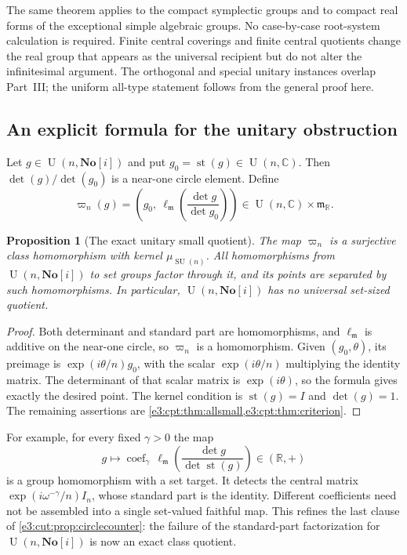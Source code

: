 \documentclass[11pt,letterpaper]{article}
\numberwithin{equation}{section}
\newtheorem{proposition}[proposition]{Proposition}
\theoremstyle{definition}
\theoremstyle{remark}
\newcommand{\No}{\mathbf{No}}
\newcommand{\R}{\mathbb R}
\newcommand{\C}{\mathbb C}
\newcommand{\mm}{\mathfrak m}
\newcommand{\st}{\operatorname{st}}
\newcommand{\SU}{\operatorname{SU}}
\newcommand{\Un}{\operatorname{U}}
\newcommand{\coef}{\operatorname{coef}}
\begin{document}
The same theorem applies to the compact symplectic groups and to compact real
forms of the exceptional simple algebraic groups. No case-by-case root-system
calculation is required. Finite central coverings and finite central quotients
change the real group that appears as the universal recipient but do not alter
the infinitesimal argument. The orthogonal and special unitary instances overlap
Part~III; the uniform all-type statement follows from the general proof here.

\subsection{An explicit formula for the unitary obstruction}

Let $g\in\Un(n,\No[i])$ and put $g_0=\st(g)\in\Un(n,\C)$. Then
$\det(g)/\det(g_0)$ is a near-one circle element. Define
\begin{equation}\label{e3:cpt:eq:unitaryq}
 \varpi_n(g)=\left(g_0,\ \ell_{\mm}\!\left(\frac{\det g}{\det g_0}\right)\right)
 \in\Un(n,\C)\times\mm_{\R}.
\end{equation}

\begin{proposition}[The exact unitary small quotient]\label{e3:cpt:prop:unitary}
The map $\varpi_n$ is a surjective class homomorphism with kernel
$\mu_{\SU(n)}$. All homomorphisms from $\Un(n,\No[i])$ to set groups factor
through it, and its points are separated by such homomorphisms. In particular,
$\Un(n,\No[i])$ has no universal set-sized quotient.
\end{proposition}
\begin{proof}
Both determinant and standard part are homomorphisms, and $\ell_{\mm}$ is
additive on the near-one circle, so $\varpi_n$ is a homomorphism. Given
$(g_0,\theta)$, its preimage is $\exp(i\theta/n)g_0$, with the scalar
$\exp(i\theta/n)$ multiplying the identity matrix. The determinant of that scalar
matrix is $\exp(i\theta)$, so the formula gives exactly the desired point. The
kernel condition is $\st(g)=I$ and $\det(g)=1$. The remaining assertions are
\cref{e3:cpt:thm:allsmall,e3:cpt:thm:criterion}.
\end{proof}

For example, for every fixed $\gamma>0$ the map
\[
 g\longmapsto\coef_\gamma\,\ell_{\mm}\!\left(\frac{\det g}{\det\st(g)}\right)
 \in(\R,+)
\]
is a group homomorphism with a set target. It detects the central matrix
$\exp(i\omega^{-\gamma}/n)I_n$, whose standard part is the identity. Different
coefficients need not be assembled into a single set-valued faithful map. This
refines the last clause of \cref{e3:cut:prop:circlecounter}: the failure of the
standard-part factorization for $\Un(n,\No[i])$ is now an exact class quotient.
\end{document}
